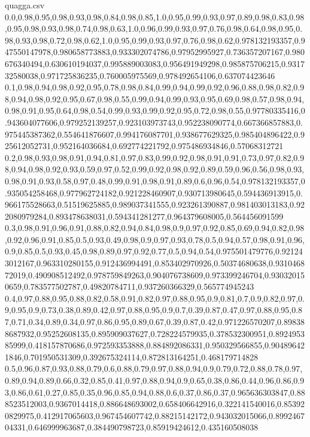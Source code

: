 \documentclass{llncs}
\begin{document}
\begin{filecontents*}{quagga.csv}
	0.0,0.98,0.95,0.98,0.93,0.98,0.84,0.98,0.85,1.0,0.95,0.99,0.93,0.97,0.89,0.98,0.83,0.98,0.95,0.98,0.93,0.98,0.74,0.98,0.63,1.0,0.96,0.99,0.93,0.97,0.76,0.98,0.64,0.98,0.95,0.98,0.93,0.98,0.72,0.98,0.62,1.0,0.95,0.99,0.93,0.97,0.76,0.98,0.62,0.978132193357,0.947550147978,0.980658773883,0.933302074786,0.97952995927,0.736357207167,0.980676340494,0.630610194037,0.995889003083,0.956491949298,0.985875706215,0.931732580038,0.971725836235,0.760005975569,0.978492654106,0.637074423646
	0.1,0.98,0.94,0.98,0.92,0.95,0.78,0.98,0.84,0.99,0.94,0.99,0.92,0.96,0.88,0.98,0.82,0.98,0.94,0.98,0.92,0.95,0.67,0.98,0.55,0.99,0.94,0.99,0.93,0.95,0.69,0.98,0.57,0.98,0.94,0.98,0.91,0.95,0.64,0.98,0.54,0.99,0.93,0.99,0.92,0.95,0.72,0.98,0.55,0.97780335416,0.943604077606,0.979252139257,0.923103973743,0.952238090774,0.667366857883,0.975445387362,0.554641876607,0.994176087701,0.938677629325,0.985404896422,0.925612052731,0.952164036684,0.692774221792,0.975486934846,0.57068312721
	0.2,0.98,0.93,0.98,0.91,0.94,0.81,0.97,0.83,0.99,0.92,0.98,0.91,0.91,0.73,0.97,0.82,0.98,0.94,0.98,0.92,0.93,0.59,0.97,0.52,0.99,0.92,0.98,0.92,0.89,0.59,0.96,0.56,0.98,0.93,0.98,0.91,0.93,0.58,0.97,0.48,0.99,0.91,0.98,0.91,0.89,0.6,0.96,0.54,0.978132193357,0.935054258468,0.977962724182,0.921228460907,0.930713980645,0.594436913915,0.966175528663,0.51519625885,0.989037341555,0.923261390887,0.981403013183,0.922080979284,0.893478638031,0.594341281277,0.964379608005,0.564456091599
	0.3,0.98,0.91,0.96,0.91,0.88,0.82,0.94,0.84,0.98,0.9,0.97,0.92,0.85,0.69,0.94,0.82,0.98,0.92,0.96,0.91,0.85,0.5,0.93,0.49,0.98,0.9,0.97,0.93,0.78,0.5,0.94,0.57,0.98,0.91,0.96,0.9,0.85,0.5,0.93,0.45,0.98,0.89,0.97,0.92,0.77,0.5,0.94,0.54,0.975501479776,0.921243012167,0.963310280155,0.912436994491,0.853402970926,0.50374680638,0.931046872019,0.490908512492,0.978759849263,0.904076738609,0.973399246704,0.930320150659,0.783577502787,0.49820784711,0.937260366329,0.565774945243
	0.4,0.97,0.88,0.95,0.88,0.82,0.58,0.91,0.82,0.97,0.88,0.95,0.9,0.81,0.7,0.9,0.82,0.97,0.9,0.95,0.9,0.73,0.38,0.89,0.42,0.97,0.88,0.95,0.9,0.7,0.39,0.87,0.47,0.97,0.88,0.95,0.87,0.71,0.34,0.89,0.34,0.97,0.86,0.95,0.89,0.67,0.39,0.87,0.42,0.971226570207,0.898388687932,0.95252608135,0.895909037627,0.728224579935,0.378532300951,0.892495385999,0.418157870686,0.972593353888,0.884892086331,0.950329566855,0.904896421846,0.701950531309,0.392675324114,0.872813164251,0.468179714828
	0.5,0.96,0.87,0.93,0.88,0.79,0.6,0.88,0.79,0.97,0.88,0.94,0.9,0.79,0.72,0.88,0.78,0.97,0.89,0.94,0.89,0.66,0.32,0.85,0.41,0.97,0.88,0.94,0.9,0.65,0.38,0.86,0.44,0.96,0.86,0.93,0.86,0.61,0.27,0.85,0.35,0.96,0.85,0.94,0.88,0.6,0.37,0.86,0.37,0.965636303847,0.888523512003,0.9367014418,0.886648693002,0.658406642916,0.322141540016,0.853920829975,0.412917065603,0.967454607742,0.88215142172,0.943032015066,0.899246704331,0.646999963687,0.384490798723,0.85919424612,0.435160508038

\end{filecontents*}
\end{document}
